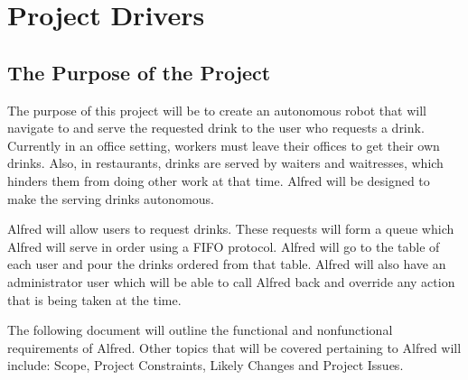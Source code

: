 \documentclass [11pt]{article}
\begin{document}
\pagebreak



\section {\textbf{Project Drivers}}

\subsection{The Purpose of the Project} 
The purpose of this project will be to create an autonomous robot that will navigate to and serve the requested drink to the user who requests a drink. Currently in an office setting, workers must leave their offices to get their own drinks. Also, in restaurants, drinks are served by waiters and waitresses, which hinders them from doing other work at that time. Alfred will be designed to make the serving drinks autonomous. \newline

Alfred will allow users to request drinks. These requests will form a queue which Alfred will serve in order using a FIFO protocol. Alfred will go to the table of each user and pour the drinks ordered from that table. Alfred will also have an administrator user which will be able to call Alfred back and override any action that is being taken at the time.\newline

The following document will outline the functional and nonfunctional requirements of Alfred.  Other topics that will be covered pertaining to Alfred will include: Scope, Project Constraints, Likely Changes and Project Issues.
%
%
%
\end{document}
